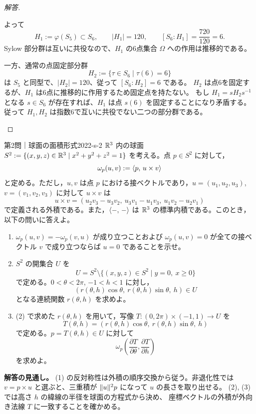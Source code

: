 \begin{proof}[解答]
\begin{enumerate}
  よって
  \[
  H_1:=\varphi(S_5)\subset S_6,
  \qquad |H_1|=120,
  \qquad [S_6:H_1]=\frac{720}{120}=6.
  \]
  Sylow 部分群は互いに共役なので、$H_1$ の6点集合 $\Omega$ への作用は推移的である。

  一方、通常の点固定部分群
  \[
  H_2:=\{\tau\in S_6\mid\tau(6)=6\}
  \]
  は $S_5$ と同型で、$|H_2|=120$、従って $[S_6:H_2]=6$ である。
  $H_2$ は点6を固定するが、$H_1$ は6点に推移的に作用するため固定点を持たない。
  もし $H_1=sH_2s^{-1}$ となる $s\in S_6$ が存在すれば、$H_1$ は点 $s(6)$ を固定することになり矛盾する。
  従って $H_1,H_2$ は指数6で互いに共役でない二つの部分群である。
\end{enumerate}
\end{proof}

\begin{problem}{第2問｜球面の面積形式}{2022-s-2}
$\mathbb{R}^3$ 内の球面 $S^2:=\{(x,y,z)\in\mathbb{R}^3\mid x^2+y^2+z^2=1\}$ を考える。点 $p\in S^2$ に対して，
\[
\omega_p(u,v):=\langle p,\, u\times v \rangle
\]
と定める。ただし，$u,v$ は点 $p$ における接ベクトルであり，$u=(u_1,u_2,u_3)$, $v=(v_1,v_2,v_3)$ に対して $u\times v$ は
\[
u\times v=(u_2v_3-u_3v_2,\ u_3v_1-u_1v_3,\ u_1v_2-u_2v_1)
\]
で定義される外積である。また，$\langle -,\, - \rangle$ は $\mathbb{R}^3$ の標準内積である。このとき，以下の問いに答えよ。
\begin{enumerate}
  \item[(1)] $\omega_p(u,v)=-\omega_p(v,u)$ が成り立つことおよび $\omega_p(u,v)=0$ が全ての接ベクトル $v$ で成り立つならば $u=0$ であることを示せ。
  \item[(2)] $S^2$ の開集合 $U$ を
  \[
  U=S^2\setminus\{(x,y,z)\in S^2\mid y=0,\ x\ge0\}
  \]
  で定める。$0<\theta<2\pi$, $-1<h<1$ に対し，
  \[
  (r(\theta,h)\cos\theta,\ r(\theta,h)\sin\theta,\ h)\in U
  \]
  となる連続関数 $r(\theta,h)$ を求めよ。
  \item[(3)] (2) で求めた $r(\theta,h)$ を用いて，写像 $T:(0,2\pi)\times(-1,1)\to U$ を
  \[
  T(\theta,h)=(r(\theta,h)\cos\theta,\ r(\theta,h)\sin\theta,\ h)
  \]
  で定める。$p=T(\theta,h)\in U$ に対して
  \[
  \omega_p\left(\frac{\partial T}{\partial\theta},\frac{\partial T}{\partial h}\right)
  \]
  を求めよ。
\end{enumerate}
\end{problem}
\begin{memo*}
\textbf{解答の見通し。}
(1) の反対称性は外積の順序交換から従う。非退化性では
$v=p\times u$ と選ぶと、三重積が $\lVert u \rVert^2p$ になって $u$ の長さを取り出せる。
(2), (3) では高さ $h$ の緯線の半径を球面の方程式から決め、
座標ベクトルの外積が外向き法線 $T$ に一致することを確かめる。
\end{memo*}
